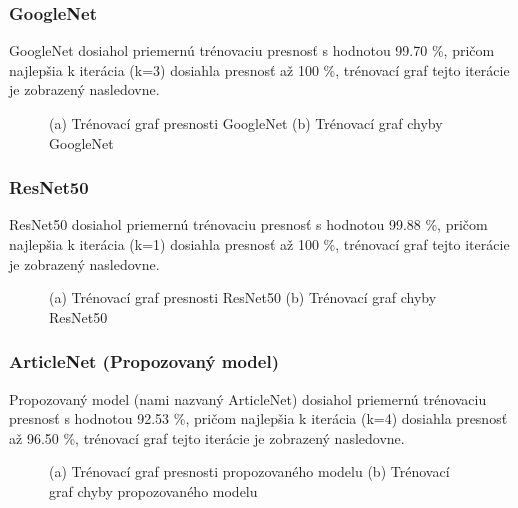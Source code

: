 \documentclass[journal,onecolumn]{IEEEtran}
\begin{document}
\subsubsection{GoogleNet}
GoogleNet dosiahol priemernú trénovaciu presnosť s hodnotou 99.70 \%, pričom najlepšia k iterácia (k=3) dosiahla presnosť až 100 \%, trénovací graf tejto iterácie je zobrazený nasledovne.

\newpage

\begin{figure}[!htb]
    \centering
    \caption{(a) Trénovací graf presnosti GoogleNet (b) Trénovací graf chyby GoogleNet} 
    \label{fig:foobar}
\end{figure}

\subsubsection{ResNet50}
ResNet50 dosiahol priemernú trénovaciu presnosť s hodnotou 99.88 \%, pričom najlepšia k iterácia (k=1) dosiahla presnosť až 100 \%, trénovací graf tejto iterácie je zobrazený nasledovne.

\begin{figure}[!htb]
    \centering
    \caption{(a) Trénovací graf presnosti ResNet50 (b) Trénovací graf chyby ResNet50} 
    \label{fig:foobar}
\end{figure}

\subsubsection{ArticleNet (Propozovaný model)}
 Propozovaný model (nami nazvaný ArticleNet) dosiahol priemernú trénovaciu presnosť s hodnotou 92.53 \%, pričom najlepšia k iterácia (k=4) dosiahla presnosť až 96.50 \%, trénovací graf tejto iterácie je zobrazený nasledovne.

\begin{figure}[!htb]
    \centering
    \caption{(a) Trénovací graf presnosti propozovaného modelu (b) Trénovací graf chyby propozovaného modelu} 
    \label{fig:foobar}
\end{figure}
\end{document}
